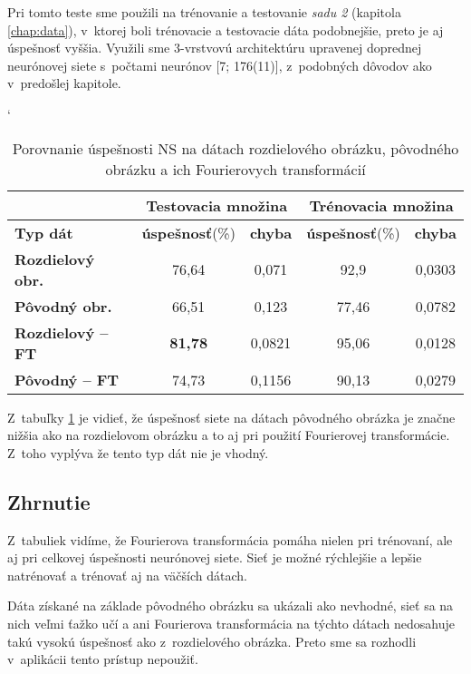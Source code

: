 Pri tomto teste sme použili na trénovanie a testovanie \textit{sadu 2} (kapitola \ref{chap:data}), v~ktorej boli trénovacie a testovacie dáta podobnejšie, preto je aj úspešnosť vyššia. Využili sme 3-vrstvovú architektúru upravenej doprednej neurónovej siete s~počtami neurónov [7; 176(11)], z~podobných dôvodov ako v~predošlej kapitole.

\begin{table}[h]
\catcode` %
\centering
\begin{tabular}{|l|c|c|c|c|}
\cline{2-5}
\multicolumn{1}{l}{} & \multicolumn{2}{|c|}{\textbf{Testovacia množina}} & \multicolumn{2}{c|}{\textbf{Trénovacia množina}}\\ 
\hline
\textbf{Typ dát} & \textbf{úspešnosť}(\%) & \textbf{chyba} & \textbf{úspešnosť}(\%) & \textbf{chyba}\\ \hline
\textbf{Rozdielový obr.} & 76,64 & 0,071 & 92,9 & 0,0303 \\ \hline
\textbf{Pôvodný obr.} & 66,51 & 0,123 & 77,46 & 0,0782 \\ \hline
\textbf{Rozdielový -- FT} & \textbf{81,78} & 0,0821 & 95,06 & 0,0128\\ \hline
\textbf{Pôvodný -- FT} & 74,73 & 0,1156 & 90,13 & 0,0279\\ \hline
\end{tabular}
\caption{Porovnanie úspešnosti NS na dátach rozdielového obrázku, pôvodného obrázku a ich Fourierovych transformácií}
\label{tab:neuraldatacmp}
\end{table}

Z~tabuľky \ref{tab:neuraldatacmp} je vidieť, že úspešnosť siete na dátach pôvodného obrázka je značne nižšia ako na rozdielovom obrázku a to aj pri použití Fourierovej transformácie. Z~toho vyplýva že tento typ dát nie je vhodný.

\subsection{Zhrnutie}

Z~tabuliek vidíme, že Fourierova transformácia pomáha nielen pri trénovaní, ale aj pri celkovej úspešnosti neurónovej siete. Sieť je možné rýchlejšie a lepšie natrénovať a trénovať aj na väčších dátach.

Dáta získané na základe pôvodného obrázku sa ukázali ako nevhodné, sieť sa na nich veľmi ťažko učí a ani Fourierova transformácia na týchto dátach nedosahuje takú vysokú úspešnosť ako z~rozdielového obrázka. Preto sme sa rozhodli v~aplikácii tento prístup nepoužiť.
